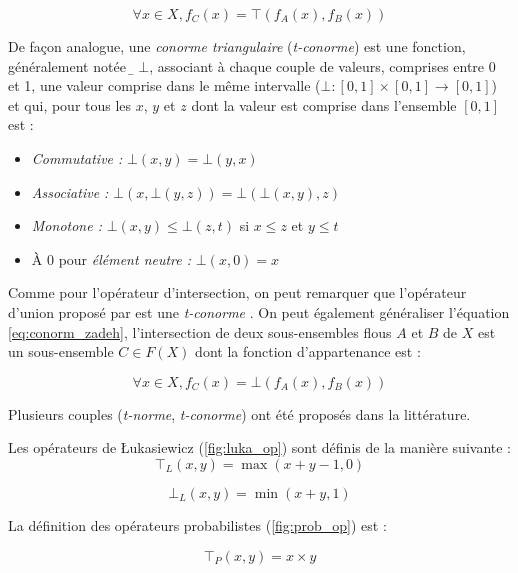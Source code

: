 \begin{equation}
   ∀x ∈ X, f_C (x) = ⊤(f_A(x), f_B(x))  
\end{equation}

De façon analogue, une \emph{conorme triangulaire} (\emph{t-conorme})
est une fonction, généralement notée \(̱⊥\), associant à chaque couple
de valeurs, comprises entre 0 et 1, une valeur comprise dans le même
intervalle (\ie $⊥ : [0,1] × [0,1] \rightarrow [0,1]$) et qui, pour
tous les $x$, $y$ et $z$ dont la valeur est comprise dans l'ensemble
$[0,1]$ est :

\begin{itemize}
\item \emph{Commutative :} \(⊥(x,y) = ⊥(y,x)\)
\item \emph{Associative :} \(⊥(x,⊥(y,z)) = ⊥(⊥(x,y),z)\)
\item \emph{Monotone :} \(⊥(x,y) ≤ ⊥(z,t)\) si \(x ≤ z\) et \(y ≤ t\)
\item À \(0\) pour \emph{élément neutre :} \(⊥(x,0) = x\)
\end{itemize}

Comme pour l'opérateur d'intersection, on peut remarquer que
l'opérateur d'union proposé par \textcite{Zadeh1965} est une
\emph{t-conorme} \autocite{Bouchon-Meunier2007}. On peut également
généraliser l'équation \ref{eq:conorm_zadeh}, l'intersection de deux
sous-ensembles flous \(A\) et \(B\) de \(X\) est un sous-ensemble
\(C ∈ F(X)\) dont la fonction d’appartenance est :

\begin{equation}
     ∀x ∈ X, f_C (x) = ⊥(f_A(x), f_B(x))  
\end{equation}

Plusieurs couples (\emph{t-norme}, \emph{t-conorme}) ont été proposés
dans la littérature.

Les opérateurs de Łukasiewicz (\autoref{fig:luka_op}) sont définis de
la manière suivante :
\begin{equation}
  ⊤_L(x,y) = \max(x + y - 1, 0) 
\end{equation}

\begin{equation}
  ⊥_L(x,y) = \min(x + y, 1)
\end{equation}

La définition des opérateurs probabilistes (\autoref{fig:prob_op}) est
:

\begin{equation}
  ⊤_P(x,y) = x×y
\end{equation}

